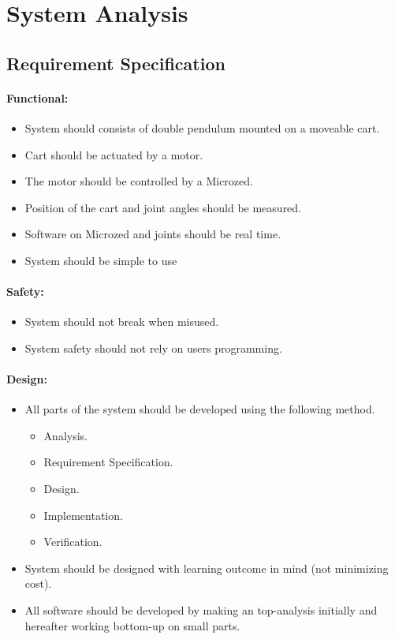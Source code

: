 \section{System Analysis}
\lipsum[5]


\subsection{Requirement Specification}
\label{sub:requirements}

\paragraph{Functional:}
\begin{itemize}
	\item System should consists of double pendulum mounted on a moveable cart.
	\item Cart should be actuated by a motor.
	\item The motor should be controlled by a Microzed.
	\item Position of the cart and joint angles should be measured.
	\item Software on Microzed and joints should be real time.
	\item System should be simple to use
\end{itemize}

\paragraph{Safety:}
\begin{itemize}
	\item System should not break when misused.
	\item System safety should not rely on users programming.
\end{itemize}

\paragraph{Design:}
\begin{itemize}
	\item All parts of the system should be developed using the following method. 
	\begin{itemize}
	 	\item Analysis.
	 	\item Requirement Specification.
	 	\item Design.
	 	\item Implementation.
	 	\item Verification.
	 \end{itemize} 
	 \item System should be designed with learning outcome in mind (not minimizing cost).
	 \item All software should be developed by making an top-analysis initially and hereafter working bottom-up on small parts. 
\end{itemize}